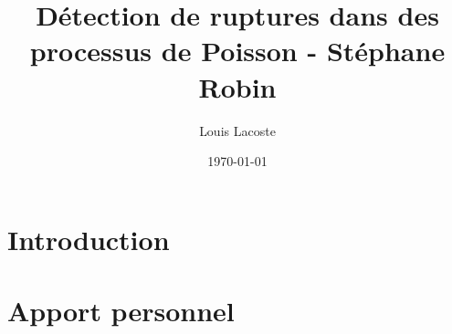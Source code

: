\documentclass[a4paper,12pt]{article}
\title{Détection de ruptures dans des processus de Poisson - Stéphane Robin}
\author{Louis Lacoste}
\date{\today}
\begin{document}
\maketitle

\section{Introduction}


\section{Apport personnel}
\end{document}
